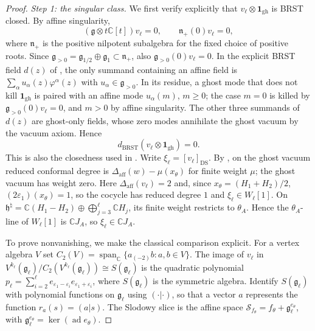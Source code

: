 \documentclass[11pt]{article}
\newcommand{\g}{\mathfrak g}
\begin{document}
\begin{proof}
\emph{Step 1: the singular class.}
We first verify explicitly that
$v_\ell\otimes\mathbf1_{\mathrm{gh}}$ is BRST closed.  By affine
singularity,
$$
 (\g\otimes t\mathbb C[t])v_\ell=0,
 \qquad \mathfrak n_+(0)v_\ell=0,
$$
where $\mathfrak n_+$ is the positive nilpotent subalgebra for the fixed
choice of positive roots.  Since $\g_{>0}=\g_{1/2}\oplus\g_1\subset
\mathfrak n_+$, also $\g_{>0}(0)v_\ell=0$.  In the explicit BRST field
$d(z)$ of \cite[\S1]{KacWakimoto2004}, the only summand containing an
affine field is $\sum_\alpha u_\alpha(z)\varphi^\alpha(z)$ with
$u_\alpha\in\g_{>0}$.  In its residue, a ghost mode that does not kill
$\mathbf1_{\mathrm{gh}}$ is paired with an affine mode $u_\alpha(m)$,
$m\ge0$; the case $m=0$ is killed by $\g_{>0}(0)v_\ell=0$, and $m>0$ by
affine singularity.  The other three summands of $d(z)$ are ghost-only
fields, whose zero modes annihilate the ghost vacuum by the vacuum axiom.
Hence
$$
 d_{\mathrm{BRST}}(v_\ell\otimes\mathbf1_{\mathrm{gh}})=0.
$$
This is also the closedness used in
\cite[Lemma~7.3(a)]{KacWakimoto2004}.
Write $\xi_\ell=[v_\ell]_{\mathrm{DS}}$.  By
\cite[Lemma~7.3(b), equation~(7.3)]{KacWakimoto2004}, on the ghost vacuum
reduced conformal degree is $\Delta_{\mathrm{aff}}(w)-\mu(x_\theta)$ for
finite weight $\mu$; the ghost vacuum has weight zero.  Here
$\Delta_{\mathrm{aff}}(v_\ell)=2$ and, since $x_\theta=(H_1+H_2)/2$,
$(2\varepsilon_1)(x_\theta)=1$, so the cocycle has reduced degree $1$ and
$\xi_\ell\in W_\ell[1]$.  On $\mathfrak h^\natural=\mathbb C(H_1-H_2)\oplus
\bigoplus_{j=3}^{\ell}\mathbb C H_j$, its finite weight restricts to
$\theta_A$.  Hence the $\theta_A$-line of $W_\ell[1]$ is
$\mathbb C J_A$, so $\xi_\ell\in\mathbb C J_A$.

To prove nonvanishing, we make the classical comparison explicit.
For a vertex algebra $V$ set
$C_2(V)=\operatorname{span}_{\mathbb C}\{a_{(-2)}b:a,b\in V\}$.
The image of $v_\ell$ in
$V^{k_\ell}(\g_\ell)/C_2(V^{k_\ell}(\g_\ell))\cong S(\g_\ell)$ is
the quadratic polynomial
$p_\ell=\sum_{i=2}^{\ell}e_{\varepsilon_1-\varepsilon_i}
e_{\varepsilon_1+\varepsilon_i}$, where $S(\g_\ell)$ is the symmetric
algebra.  Identify $S(\g_\ell)$ with polynomial functions on $\g_\ell$
using $(\cdot|\cdot)$, so that a vector $a$ represents the function
$r_a(s)=(a|s)$.
The Slodowy slice is the affine space
$\mathcal S_{f_\theta}=f_\theta+\g_\ell^{e_\theta}$, with
$\g_\ell^{e_\theta}=\ker(\operatorname{ad}e_\theta)$.


\end{proof}
\end{document}
